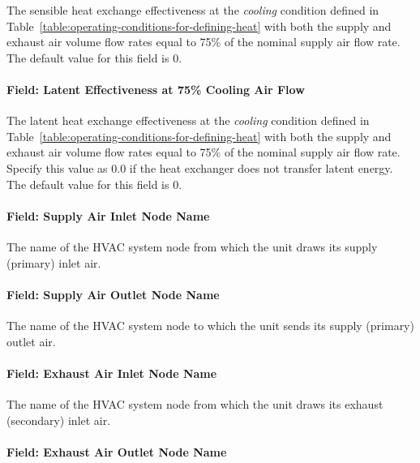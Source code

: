 The sensible heat exchange effectiveness at the \emph{cooling} condition defined in Table~\ref{table:operating-conditions-for-defining-heat} with both the supply and exhaust air volume flow rates equal to 75\% of the nominal supply air flow rate. The default value for this field is 0.

\paragraph{Field: Latent Effectiveness at 75\% Cooling Air Flow}\label{field-latent-effectiveness-at-75-cooling-air-flow}

The latent heat exchange effectiveness at the \emph{cooling} condition defined in Table~\ref{table:operating-conditions-for-defining-heat} with both the supply and exhaust air volume flow rates equal to 75\% of the nominal supply air flow rate. Specify this value as 0.0 if the heat exchanger does not transfer latent energy. The default value for this field is 0.

\paragraph{Field: Supply Air Inlet Node Name}\label{field-supply-air-inlet-node-name-1-000}

The name of the HVAC system node from which the unit draws its supply (primary) inlet air.

\paragraph{Field: Supply Air Outlet Node Name}\label{field-supply-air-outlet-node-name-1}

The name of the HVAC system node to which the unit sends its supply (primary) outlet air.

\paragraph{Field: Exhaust Air Inlet Node Name}\label{field-exhaust-air-inlet-node-name}

The name of the HVAC system node from which the unit draws its exhaust (secondary) inlet air.

\paragraph{Field: Exhaust Air Outlet Node Name}\label{field-exhaust-air-outlet-node-name}

